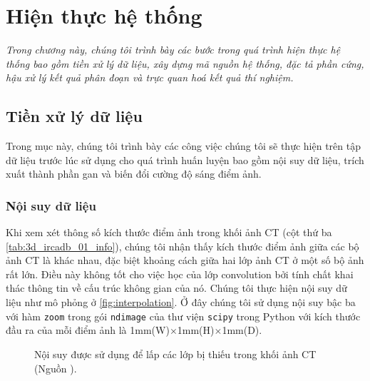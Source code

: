 \chapter{Hiện thực hệ thống}
\label{chap:hien_thuc_he_thong}
	\textit{Trong chương này, chúng tôi trình bày các bước trong quá trình hiện thực hệ thống bao gồm tiền xử lý dữ liệu, xây dựng mã nguồn hệ thống, đặc tả phần cứng, hậu xử lý kết quả phân đoạn và trực quan hoá kết quả thí nghiệm.}
\minitoc

\section{Tiền xử lý dữ liệu} 
\label{sec:tien_xu_ly_du_lieu}
	Trong mục này, chúng tôi trình bày các công việc chúng tôi sẽ thực hiện trên tập dữ liệu trước lúc sử dụng cho quá trình huấn luyện bao gồm nội suy dữ liệu, trích xuất thành phần gan và biến đổi cường độ sáng điểm ảnh.

\subsection{Nội suy dữ liệu} 
\label{subsec:noi_suy_du_lieu}
	Khi xem xét thông số kích thước điểm ảnh trong khối ảnh CT (cột thứ ba \autoref{tab:3d_ircadb_01_info}), chúng tôi nhận thấy kích thước điểm ảnh giữa các bộ ảnh CT là khác nhau, đặc biệt khoảng cách giữa hai lớp ảnh CT ở một số bộ ảnh rất lớn. Điều này không tốt cho việc học của lớp convolution bởi tính chất khai thác thông tin về cấu trúc không gian của nó. Chúng tôi thực hiện nội suy dữ liệu như mô phỏng ở \autoref{fig:interpolation}. Ở đây chúng tôi sử dụng nội suy bậc ba với hàm \verb/zoom/ trong gói \verb/ndimage/ của thư viện \verb/scipy/ trong Python với kích thước đầu ra của mỗi điểm ảnh là 1mm(W)$\times$1mm(H)$\times$1mm(D).
	\begin{figure}[h!]
		\centering
		
		\caption[Nội suy được sử dụng để lấp các lớp bị thiếu trong khối ảnh CT.]{Nội suy được sử dụng để lấp các lớp bị thiếu trong khối ảnh CT (Nguồn \cite{sach2017interpolation}).}
		\label{fig:interpolation}
	\end{figure}

